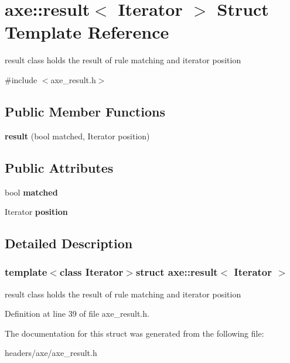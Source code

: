 \hypertarget{structaxe_1_1result}{\section{axe\+:\+:result$<$ Iterator $>$ Struct Template Reference}
\label{structaxe_1_1result}
}


result class holds the result of rule matching and iterator position  




{\ttfamily \#include $<$axe\+\_\+result.\+h$>$}

\subsection*{Public Member Functions}
\begin{DoxyCompactItemize}
\item 
\hypertarget{structaxe_1_1result_a59eda667add884705548e40024e00e02}{{\bfseries result} (bool matched, Iterator position)}\label{structaxe_1_1result_a59eda667add884705548e40024e00e02}

\end{DoxyCompactItemize}
\subsection*{Public Attributes}
\begin{DoxyCompactItemize}
\item 
\hypertarget{structaxe_1_1result_a880702a8671396db91a770a217f7ef77}{bool {\bfseries matched}}\label{structaxe_1_1result_a880702a8671396db91a770a217f7ef77}

\item 
\hypertarget{structaxe_1_1result_ac7be0deb47b023bb455f5a4f3328ebe9}{Iterator {\bfseries position}}\label{structaxe_1_1result_ac7be0deb47b023bb455f5a4f3328ebe9}

\end{DoxyCompactItemize}


\subsection{Detailed Description}
\subsubsection*{template$<$class Iterator$>$struct axe\+::result$<$ Iterator $>$}

result class holds the result of rule matching and iterator position 

Definition at line 39 of file axe\+\_\+result.\+h.



The documentation for this struct was generated from the following file\+:\begin{DoxyCompactItemize}
\item 
headers/axe/axe\+\_\+result.\+h\end{DoxyCompactItemize}
